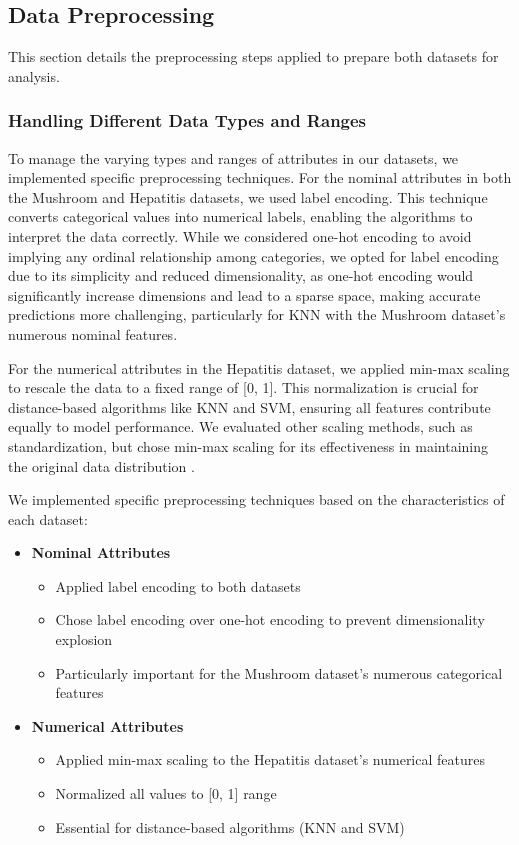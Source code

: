 \subsection{Data Preprocessing}
\label{subsec:preprocessing}

This section details the preprocessing steps applied to prepare both datasets for analysis.

\subsubsection{Handling Different Data Types and Ranges}To manage the varying types and ranges of attributes in our datasets, we implemented specific preprocessing techniques.
For the nominal attributes in both the Mushroom and Hepatitis datasets, we used label encoding.
This technique converts categorical values into numerical labels, enabling the algorithms to interpret the data correctly.
While we considered one-hot encoding to avoid implying any ordinal relationship among categories, we opted for label encoding due to its simplicity and reduced dimensionality, as one-hot encoding would significantly increase dimensions and lead to a sparse space, making accurate predictions more challenging, particularly for KNN with the Mushroom dataset's numerous nominal features.

For the numerical attributes in the Hepatitis dataset, we applied min-max scaling to rescale the data to a fixed range of [0, 1]. This normalization is crucial for distance-based algorithms like KNN and SVM, ensuring all features contribute equally to model performance.
We evaluated other scaling methods, such as standardization, but chose min-max scaling for its effectiveness in maintaining the original data distribution \cite{data_cleaning}.

We implemented specific preprocessing techniques based on the characteristics of each dataset:

\begin{itemize}
    \item \textbf{Nominal Attributes}
    \begin{itemize}
        \item Applied label encoding to both datasets
        \item Chose label encoding over one-hot encoding to prevent dimensionality explosion
        \item Particularly important for the Mushroom dataset's numerous categorical features
    \end{itemize}
    
    \item \textbf{Numerical Attributes}
    \begin{itemize}
        \item Applied min-max scaling to the Hepatitis dataset's numerical features
        \item Normalized all values to [0, 1] range
        \item Essential for distance-based algorithms (KNN and SVM)
    \end{itemize}
\end{itemize}

